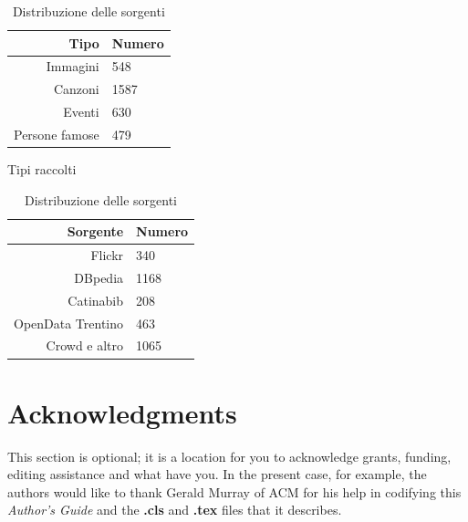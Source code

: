 \documentclass{acm_proc_article-sp}
\begin{document}
\begin{table}
\parbox{.45\linewidth}{
\centering
\begin{tabular}{|r|l|}
\hline
Tipo & Numero \\
\hline
Immagini & 548 \\
Canzoni & 1587 \\
Eventi & 630 \\
Persone famose & 479 \\
\hline
\end{tabular}
\caption{Tipi raccolti}
}
\hfill
\parbox{.45\linewidth}{
\centering
\begin{tabular}{|r|l|}
\hline
Sorgente & Numero \\
\hline
Flickr & 340 \\
DBpedia & 1168 \\
Catinabib & 208 \\
OpenData Trentino & 463 \\
Crowd e altro & 1065 \\
\hline
\end{tabular}
\caption{Distribuzione delle sorgenti}
}
\end{table}





\section{Acknowledgments}
This section is optional; it is a location for you
to acknowledge grants, funding, editing assistance and
what have you.  In the present case, for example, the
authors would like to thank Gerald Murray of ACM for
his help in codifying this \textit{Author's Guide}
and the \textbf{.cls} and \textbf{.tex} files that it describes.

%

%
%
\appendix
\end{document}
